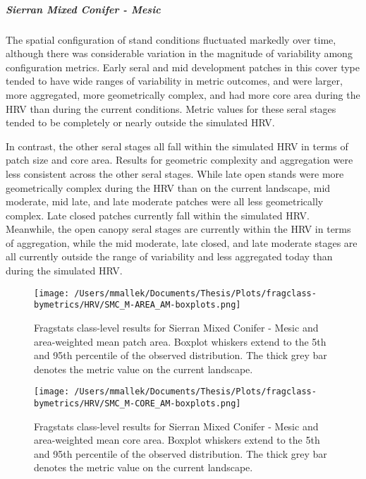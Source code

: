 \subparagraph{Sierran Mixed Conifer - Mesic} %
The spatial configuration of stand conditions fluctuated markedly over time, although there was considerable variation in the magnitude of variability among configuration metrics. Early seral and mid development patches in this cover type tended to have wide ranges of variability in metric outcomes, and were larger, more aggregated, more geometrically complex, and had more core area during the HRV than during the current conditions. Metric values for these seral stages tended to be completely or nearly outside the simulated HRV. 

In contrast, the other seral stages all fall within the simulated HRV in terms of patch size and core area. Results for geometric complexity and aggregation were less consistent across the other seral stages. While late open stands were more geometrically complex during the HRV than on the current landscape, mid moderate, mid late, and late moderate patches were all less geometrically complex. Late closed patches currently fall within the simulated HRV. Meanwhile, the open canopy seral stages are currently within the HRV in terms of aggregation, while the mid moderate, late closed, and late moderate stages are all currently outside the range of variability and less aggregated today than during the simulated HRV.  

\begin{figure}[!htbp]
\centering
    \texttt{[image: /Users/mmallek/Documents/Thesis/Plots/fragclass-bymetrics/HRV/SMC\_M-AREA\_AM-boxplots.png]}
  \caption{Fragstats class-level results for Sierran Mixed Conifer - Mesic and area-weighted mean patch area. Boxplot whiskers extend to the 5th and 95th percentile of the observed distribution. The thick grey bar denotes the metric value on the current landscape.}
  \label{fig:smcm_areaam}
\end{figure}


\begin{figure}[!htbp]
\centering
    \texttt{[image: /Users/mmallek/Documents/Thesis/Plots/fragclass-bymetrics/HRV/SMC\_M-CORE\_AM-boxplots.png]}
  \caption{Fragstats class-level results for Sierran Mixed Conifer - Mesic and area-weighted mean core area. Boxplot whiskers extend to the 5th and 95th percentile of the observed distribution. The thick grey bar denotes the metric value on the current landscape.}
  \label{fig:smcm_coream}
\end{figure}


